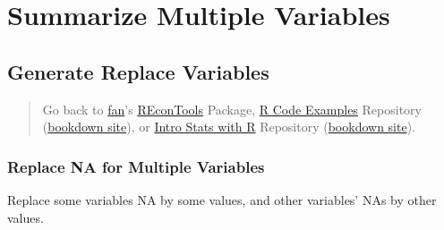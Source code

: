 \documentclass[
]{book}
\newenvironment{Shaded}{\begin{snugshade}}{\end{snugshade}}
\newcommand{\CommentTok}[1]{\textcolor[rgb]{0.56,0.35,0.01}{\textit{#1}}}
\newcommand{\DataTypeTok}[1]{\textcolor[rgb]{0.13,0.29,0.53}{#1}}
\newcommand{\DecValTok}[1]{\textcolor[rgb]{0.00,0.00,0.81}{#1}}
\newcommand{\KeywordTok}[1]{\textcolor[rgb]{0.13,0.29,0.53}{\textbf{#1}}}
\newcommand{\NormalTok}[1]{#1}
\newcommand{\OperatorTok}[1]{\textcolor[rgb]{0.81,0.36,0.00}{\textbf{#1}}}
\newcommand{\OtherTok}[1]{\textcolor[rgb]{0.56,0.35,0.01}{#1}}
\newcommand{\StringTok}[1]{\textcolor[rgb]{0.31,0.60,0.02}{#1}}
\begin{document}
\hypertarget{summarize-multiple-variables}{%
\section{Summarize Multiple Variables}\label{summarize-multiple-variables}}

\hypertarget{generate-replace-variables}{%
\subsection{Generate Replace Variables}\label{generate-replace-variables}}

\begin{quote}
Go back to \href{http://fanwangecon.github.io/}{fan}'s \href{https://fanwangecon.github.io/REconTools/}{REconTools} Package, \href{https://fanwangecon.github.io/R4Econ/}{R Code Examples} Repository (\href{https://fanwangecon.github.io/R4Econ/bookdown}{bookdown site}), or \href{https://fanwangecon.github.io/Stat4Econ/}{Intro Stats with R} Repository (\href{https://fanwangecon.github.io/Stat4Econ/bookdown}{bookdown site}).
\end{quote}

\hypertarget{replace-na-for-multiple-variables}{%
\subsubsection{Replace NA for Multiple Variables}\label{replace-na-for-multiple-variables}}

Replace some variables NA by some values, and other variables' NAs by other values.

\begin{Shaded}
\end{Shaded}
\end{document}
